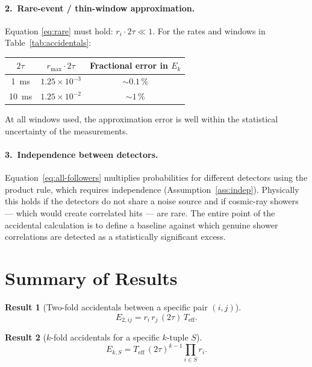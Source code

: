 \documentclass[12pt]{article}
\theoremstyle{definition}
\newtheorem{result}{Result}
\newcommand{\Teff}{T_{\!\text{eff}}}
\newcommand{\Eacc}[1]{E_{#1}}
\begin{document}
\paragraph{2.~Rare-event / thin-window approximation.}
Equation \eqref{eq:rare} must hold: $r_i \cdot 2\tau \ll 1$.  For the
rates and windows in Table~\ref{tab:accidentals}:

\begin{center}
\renewcommand{\arraystretch}{1.3}
\begin{tabular}{ccc}
\toprule
$2\tau$ & $r_{\max}\cdot 2\tau$ & Fractional error in $\Eacc{k}$ \\
\midrule
1~ms  & $1.25\times10^{-3}$ & $\sim 0.1\,\%$ \\
10~ms & $1.25\times10^{-2}$ & $\sim 1\,\%$ \\
\bottomrule
\end{tabular}
\end{center}

At all windows used, the approximation error is well within the
statistical uncertainty of the measurements.

\paragraph{3.~Independence between detectors.}
Equation~\eqref{eq:all-followers} multiplies probabilities for different
detectors using the product rule, which requires independence
(Assumption~\ref{ass:indep}).  Physically this holds if the detectors do
not share a noise source and if cosmic-ray showers — which would create
correlated hits — are rare.  The entire point of the accidental
calculation is to define a baseline against which genuine shower
correlations are detected as a statistically significant excess.

\section{Summary of Results}
\label{sec:summary}

\begin{result}[Two-fold accidentals between a specific pair $(i,j)$]
\[
    \Eacc{2,ij} = r_i\,r_j\,(2\tau)\,\Teff. \tag{6.1}
\]
\end{result}

\begin{result}[$k$-fold accidentals for a specific $k$-tuple $S$]
\[
    \Eacc{k,S} = \Teff\,(2\tau)^{k-1}\prod_{i\in S} r_i. \tag{6.2}
\]
\end{result}
\end{document}

